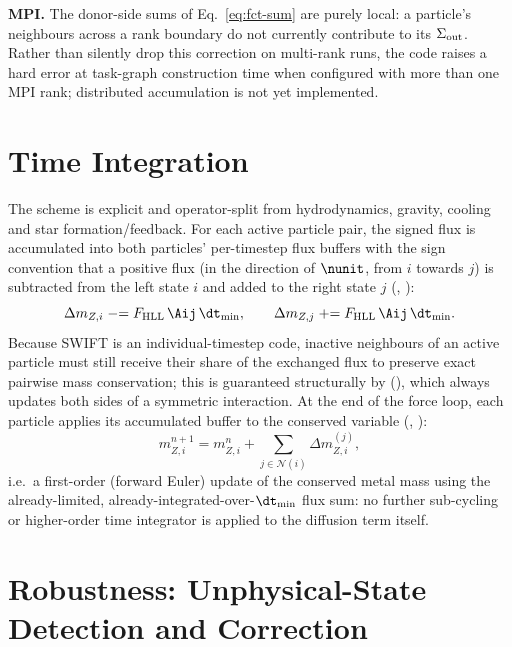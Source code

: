 \textbf{MPI.}
The donor-side sums of Eq.~\eqref{eq:fct-sum} are purely local: a
particle's neighbours across a rank boundary do not currently contribute
to its $\Sigma_{\rm out}$. Rather than silently drop this correction on
multi-rank runs, the code raises a hard error at task-graph construction
time when configured with more than one MPI rank; distributed
accumulation is not yet implemented.

\section{Time Integration}
\label{sec:time-integration}

The scheme is explicit and operator-split from hydrodynamics, gravity,
cooling and star formation/feedback. For each active particle pair, the
signed flux is accumulated into both particles' per-timestep flux
buffers with the sign convention that a positive flux (in the direction
of $\nunit$, from $i$ towards $j$) is subtracted from the left state $i$
and added to the right state $j$
(,
):
\begin{equation}
  \Delta m_{Z,i} \mathrel{-}= F_{\rm HLL}\,\Aij\, \dt_{\min} , \qquad
  \Delta m_{Z,j} \mathrel{+}= F_{\rm HLL}\,\Aij\, \dt_{\min} .
\end{equation}
Because SWIFT is an individual-timestep code, inactive neighbours of an
active particle must still receive their share of the exchanged flux to
preserve exact pairwise mass conservation; this is guaranteed structurally
by 
(), which always updates both sides of a
symmetric interaction. At the end of the force loop, each particle
applies its accumulated buffer to the conserved variable
(, ):
\begin{equation}
  m_{Z,i}^{n+1} = m_{Z,i}^{n} + \sum_{j\in\mathcal N(i)} \Delta m_{Z,i}^{(j)} ,
\end{equation}
i.e.\ a first-order (forward Euler) update of the conserved metal mass
using the already-limited, already-integrated-over-$\dt_{\min}$ flux sum:
no further sub-cycling or higher-order time integrator is applied to the
diffusion term itself.

\section{Robustness: Unphysical-State Detection and Correction}
\label{sec:unphysical}

